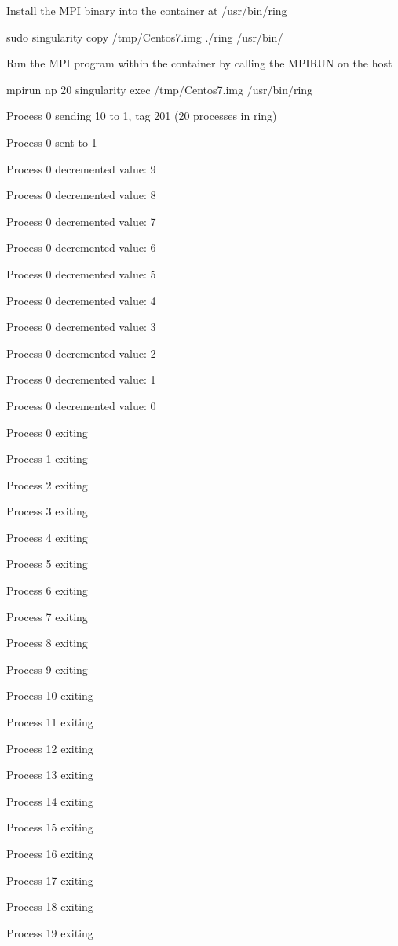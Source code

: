\documentclass[letterpaper,10pt,english]{sphinxmanual}
\begin{document}
\begin{sphinxVerbatim}[commandchars=\\\{\}]
\PYGZdl{}

\PYGZdl{} \PYGZsh{} Install the MPI binary into the container at /usr/bin/ring

\PYGZdl{} sudo singularity copy /tmp/Centos\PYGZhy{}7.img ./ring /usr/bin/

\PYGZdl{}

\PYGZdl{} \PYGZsh{} Run the MPI program within the container by calling the MPIRUN on the host

\PYGZdl{} mpirun \PYGZhy{}np 20 singularity exec /tmp/Centos\PYGZhy{}7.img /usr/bin/ring



Process 0 sending 10 to 1, tag 201 (20 processes in ring)

Process 0 sent to 1

Process 0 decremented value: 9

Process 0 decremented value: 8

Process 0 decremented value: 7

Process 0 decremented value: 6

Process 0 decremented value: 5

Process 0 decremented value: 4

Process 0 decremented value: 3

Process 0 decremented value: 2

Process 0 decremented value: 1

Process 0 decremented value: 0

Process 0 exiting

Process 1 exiting

Process 2 exiting

Process 3 exiting

Process 4 exiting

Process 5 exiting

Process 6 exiting

Process 7 exiting

Process 8 exiting

Process 9 exiting

Process 10 exiting

Process 11 exiting

Process 12 exiting

Process 13 exiting

Process 14 exiting

Process 15 exiting

Process 16 exiting

Process 17 exiting

Process 18 exiting

Process 19 exiting
\end{sphinxVerbatim}
\end{document}

